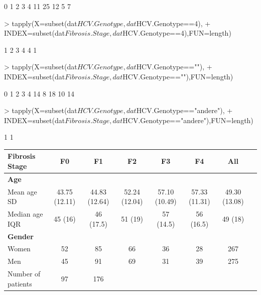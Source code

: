\documentclass{article}
\begin{document}
\begin{enumerate}
\begin{enumerate}
\begin{enumerate}
\begin{Schunk}
\begin{Sinput}
\end{Sinput}
\begin{Soutput}
 0  1  2  3  4 
11 25 12  5  7 
\end{Soutput}
\begin{Sinput}
> tapply(X=subset(dat$HCV.Genotype,dat$HCV.Genotype==4),
+        INDEX=subset(dat$Fibrosis.Stage,dat$HCV.Genotype==4),FUN=length)
\end{Sinput}
\begin{Soutput}
1 2 3 
4 4 1 
\end{Soutput}
\begin{Sinput}
> tapply(X=subset(dat$HCV.Genotype,dat$HCV.Genotype==""),
+        INDEX=subset(dat$Fibrosis.Stage,dat$HCV.Genotype==""),FUN=length)
\end{Sinput}
\begin{Soutput}
 0  1  2  3  4 
14  8 18 10 14 
\end{Soutput}
\begin{Sinput}
> tapply(X=subset(dat$HCV.Genotype,dat$HCV.Genotype=="andere"),
+        INDEX=subset(dat$Fibrosis.Stage,dat$HCV.Genotype=="andere"),FUN=length)
\end{Sinput}
\begin{Soutput}
1 
1 
\end{Soutput}
\end{Schunk}
  \begin{table}[H]
  \centering
    \begin{tabular}{lccccccc}\hline
    Fibrosis Stage    & F0 & F1 & F2 & F3 & F4 & All\\\hline\hline
    \textbf{Age}                &&&&&&\\
    Mean age SD        & 43.75 (12.11)& 44.83 (12.64)&
                         52.24 (12.04)& 57.10 (10.49)&
                         57.33 (11.31)& 49.30 (13.08)\\
    Median age IQR     & 45 (16)      & 46 (17.5)    &
                         51 (19)      & 57 (14.5)    &
                         56 (16.5)    & 49 (18)\\
    \textbf{Gender}             &&&&&&\\
    Women              & 52           & 85           &
                         66           & 36           &
                         28           & 267\\
    Men                & 45           & 91           &
                         69           & 31           &
                         39           & 275\\
    Number of patients & 97           & 176          & 

\end{tabular}
\end{table}
\end{enumerate}
\end{enumerate}
\end{enumerate}
\end{document}
